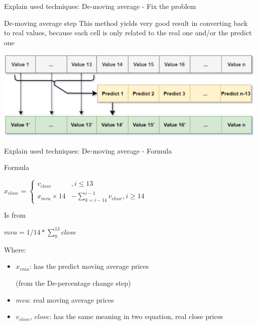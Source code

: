 \documentclass[compress, mathserif, fleqn, 10pt]{beamer}
\begin{document}
	\begin{frame}{Explain used techniques: De-moving average - Fix the problem}
		\begin{block}{De-moving average step}
			This method yields very good result in converting back to real values,
			because each cell is only related to the real one and/or the predict one
		\end{block}
		\smallskip
		\centerline{\includegraphics[width=\textwidth]{images/dec_moving.eps}}
		\bigskip
	\end{frame}
	
	\begin{frame}{Explain used techniques: De-moving average - Formula}
		\begin{block}{Formula}
			\centerline{$x_{close}= \begin{cases}v_{close}&, i \leq 13 \\ x_{mva}\times 14&- \sum_{k=i-14}^{i-1}v_{close}, i \geq 14\end{cases}$}
			
			\smallskip
			
			\centerline{Is from}
			
			\smallskip
			
			\centerline{$mva=1/14 * \sum_{0}^{13}close$}
			
			\smallskip
			Where:
			
			\begin{itemize}
				\item $x_{vma}$: has the predict moving average prices
				
				(from the De-percentage change step)
				
				\item $mva$: real moving average prices
				
				\item $v_{close}$, $close$: has the same meaning in two equation, real
				close prices
			\end{itemize}
		\end{block}
	\end{frame}
\end{document}
